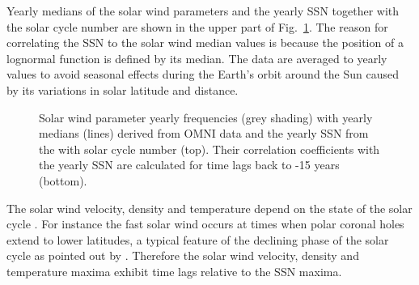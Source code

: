 Yearly medians of the solar wind parameters and the yearly SSN together with the solar cycle number are shown in the upper part of Fig.~\ref{fig:OMNI_yearly_ssn_correlation_c_plot}. The reason for correlating the SSN to the solar wind median values is because the position of a lognormal function is defined by its median. The data are averaged to yearly values to avoid seasonal effects during the Earth’s orbit around the Sun caused by its variations in solar latitude and distance.
\begin{figure}
	\caption{Solar wind parameter yearly frequencies (grey shading) with yearly medians (lines) derived from OMNI data and the yearly SSN from the \citet{sidc} with solar cycle number (top). Their correlation coefficients with the yearly SSN are calculated for time lags back to -15 years (bottom).}
	\label{fig:OMNI_yearly_ssn_correlation_c_plot}
\end{figure}
The solar wind velocity, density and temperature depend on the state of the solar cycle \citep{Schwenn1983}. %
For instance the fast solar wind occurs at times when polar coronal holes extend to lower latitudes, a typical feature of the declining phase of the solar cycle as pointed out by \citet[p.~75, Figure~3.52]{Bothmer2007}. Therefore the solar wind velocity, density and temperature maxima exhibit time lags relative to the SSN maxima.

